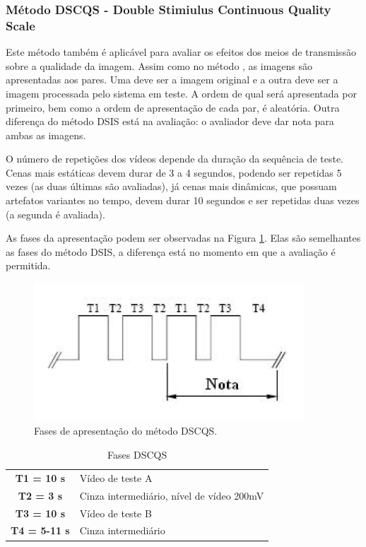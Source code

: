 \subsubsection[Método DSCQS]{Método DSCQS - Double Stimiulus Continuous Quality Scale}

Este método também é aplicável para avaliar os efeitos dos meios de transmissão sobre a qualidade da imagem. Assim como no método , as imagens são apresentadas aos pares. Uma deve ser a imagem original e a outra deve ser a imagem processada pelo sistema em teste. A ordem de qual será apresentada por primeiro, bem como a ordem de apresentação de cada par, é aleatória. Outra diferença do método DSIS está na avaliação: o avaliador deve dar nota para ambas as imagens.

O número de repetições dos vídeos depende da duração da sequência de teste. Cenas mais estáticas devem durar de 3 a 4 segundos, podendo ser repetidas 5 vezes (as duas últimas são avaliadas), já cenas mais dinâmicas, que possuam artefatos variantes no tempo, devem durar 10 segundos e ser repetidas duas vezes (a segunda é avaliada).

As fases da apresentação  podem ser observadas na Figura \ref{fig:dscqsfases}. Elas são semelhantes as fases do método DSIS, a diferença está no momento em que a avaliação é permitida. 

\begin{figure}[!htb]
	\centering
	\includegraphics[width=0.9\textwidth]{./imgs/dscqsfases.png}
	\caption{Fases de apresentação do método DSCQS.}
	\label{fig:dscqsfases}
\end{figure}

\begin{table}
	\centering
	\caption{Fases DSCQS}
	\label{tab:dsisfases}
	\begin{tabular}{c|l}
		\hline
		\textbf{T1 = 10 s} & Vídeo de teste A \\
		\textbf{T2 = 3 s} & Cinza intermediário, nível de vídeo 200mV \\
		\textbf{T3 = 10 s} & Vídeo de teste B \\
		\textbf{T4 = 5-11 s} & Cinza intermediário \\
		\hline
	\end{tabular}
\end{table}

